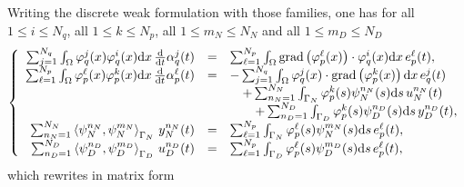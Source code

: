 \documentclass[letterpaper,10pt,english]{sphinxmanual}
\begin{document}
\sphinxAtStartPar
Writing the discrete weak formulation with those families, one has for
all \(1 \le i \le N_q\), all \(1 \le k \le N_p\), all
\(1 \le m_N \le N_N\) and all \(1 \le m_D \le N_D\)
\begin{equation}\label{equation:examples/wave:weak-form-IBP}
\begin{split}   \left\lbrace
   \begin{array}{rcl}
   \sum_{j=1}^{N_q} \int_\Omega \varphi_q^j(x) \varphi_q^i(x) {\rm d}x \, \frac{\rm d}{{\rm d}t} \alpha_q^j(t) &=& \sum_{\ell=1}^{N_p} \int_\Omega {\rm grad} \left( \varphi_p^\ell(x) \right) \cdot \varphi_q^i(x) {\rm d}x \, e_p^\ell(t), \\
   \sum_{\ell=1}^{N_p} \int_\Omega \varphi_p^\ell(x) \varphi_p^k(x) {\rm d}x \, \frac{\rm d}{{\rm d}t} \alpha_p^\ell(t) &=& - \sum_{j=1}^{N_q} \int_\Omega \varphi_q^j(x) \cdot {\rm grad} \left( \varphi_p^k(x) \right) {\rm d}x \, e_q^j(t) \\
   && \quad + \sum_{n_N=1}^{N_N} \int_{\Gamma_N} \varphi_p^k(s) \psi_N^{n_N}(s) {\rm d}s \, u_N^{n_N}(t) \\
   && \qquad + \sum_{n_D=1}^{N_D} \int_{\Gamma_D} \varphi_p^k(s) \psi_D^{n_D}(s) {\rm d}s \, y_D^{n_D}(t), \\
   \sum_{n_N=1}^{N_N} \left\langle \psi_N^{n_N}, \psi_N^{m_N} \right\rangle_{\Gamma_N} \, y_N^{n_N}(t) &=& \sum_{\ell=1}^{N_p} \int_{\Gamma_N} \varphi_p^\ell(s) \psi_N^{m_N}(s) {\rm d}s \, e_p^\ell(t), \\
   \sum_{n_D=1}^{N_D} \left\langle \psi_D^{n_D}, \psi_D^{m_D} \right\rangle_{\Gamma_D} \, u_D^{n_D}(t) &=& \sum_{\ell=1}^{N_p} \int_{\Gamma_D} \varphi_p^\ell(s) \psi_D^{m_D}(s) {\rm d}s \, e_p^\ell(t),
   \end{array}
   \right.\end{split}
\end{equation}
\sphinxAtStartPar
which rewrites in matrix form
\end{document}
